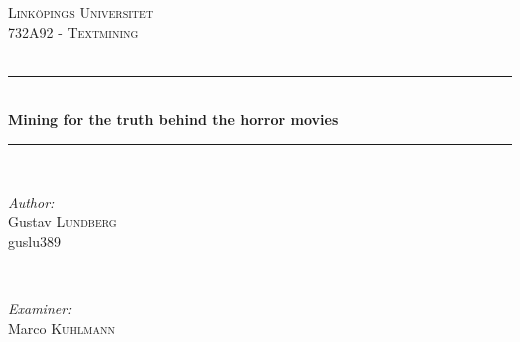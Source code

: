 \documentclass[11pt,a4paper]{article}
\begin{document}
\newcommand\numberthis{\addtocounter{equation}{1}\tag{\theequation}}

\begin{titlepage}
\pagecolor{black!90}
\color{red}
\Fontskrivan
\newcommand{\HRule}{\rule{\linewidth}{0.5mm}} %


\center %
 

\textsc{\LARGE Linköpings Universitet}\\[0.5cm] %
\textsc{\Large 732A92 - Textmining}\\[0.5cm] %
\textsc{\large }\\[4.5cm] %


\HRule \\[0.4cm]
{ \huge \bfseries Mining for the truth behind the horror movies}\\[0.4cm] %
\HRule \\[1.5cm]
 

\begin{minipage}{0.4\textwidth}
\begin{flushleft} \large
\emph{Author:}\\
Gustav \textsc{Lundberg} \\ %
guslu389
\end{flushleft}
\end{minipage}
~
\begin{minipage}{0.4\textwidth}
\begin{flushright} \large
\emph{Examiner:} \\
Marco \textsc{Kuhlmann} %
\end{flushright}
\end{minipage}\\[2cm]


\end{titlepage}
\end{document}
